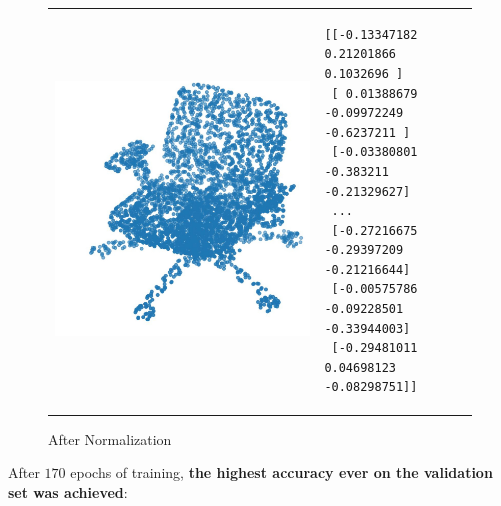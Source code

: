 \documentclass[11pt,a4paper]{article}
\begin{document}
\begin{figure}[H]
\begin{tabular}{p{}p{}}
\rowcolor{white}
    \begin{minipage}{.4\textwidth}
        \centering
        \includegraphics[scale=0.3]{imgs/example-mesh-normalization-after.jpg}
        \caption{After Normalization}
    \end{minipage}
    &
    \begin{minipage}{.6\textwidth}
        \begin{lstlisting}
[[-0.13347182  0.21201866  0.1032696 ]
 [ 0.01388679 -0.09972249 -0.6237211 ]
 [-0.03380801 -0.383211   -0.21329627]
 ...
 [-0.27216675 -0.29397209 -0.21216644]
 [-0.00575786 -0.09228501 -0.33944003]
 [-0.29481011  0.04698123 -0.08298751]]
        \end{lstlisting}
    \end{minipage}
\end{tabular}
\end{figure}
\noindent
After $170$ epochs of training, \textbf{the highest accuracy ever on the validation set was achieved}:
\end{document}
